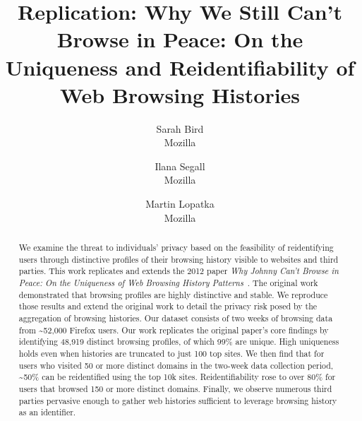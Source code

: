 \documentclass[letterpaper,twocolumn,10pt]{article}
\begin{document}
\date{} %
\title{\Large \bf Replication: Why We Still Can't Browse in Peace: On the Uniqueness and Reidentifiability of Web Browsing Histories}
%
\def\plainauthor{Author name(s) for PDF metadata. Don't forget to anonymize for submission!}
%
\author{
{\rm Sarah Bird}\\
Mozilla
\and
{\rm Ilana Segall}\\
Mozilla
\and
{\rm Martin Lopatka}\\
Mozilla
} %
%
\maketitle
\thecopyright
\begin{abstract}
We examine the threat to individuals' privacy based on the feasibility of reidentifying users through distinctive profiles of their browsing history visible to websites and third parties.
This work replicates and extends the 2012 paper \textit{Why Johnny Can't Browse in Peace: On the Uniqueness of Web Browsing History Patterns}~\cite{olejnikWhyJohnnyCan2012}. The original work demonstrated that browsing profiles are highly distinctive and stable.
We reproduce those results and extend the original work to detail the privacy risk posed by the aggregation of browsing histories. 
Our dataset consists of two weeks of browsing data from \textasciitilde{52,000} Firefox users.
Our work replicates the original paper's core findings by identifying 48,919 distinct browsing profiles, of which 99\% are unique.
High uniqueness holds even when histories are truncated to just 100 top sites.
We then find that for users who visited 50 or more distinct domains in the two-week data collection period, \textasciitilde{50\%} can be reidentified using the top 10k sites.
Reidentifiability rose to over 80\% for users that browsed 150 or more distinct domains. 
Finally, we observe numerous third parties pervasive enough to gather web histories sufficient to leverage browsing history as an identifier.

\end{abstract}
\end{document}
